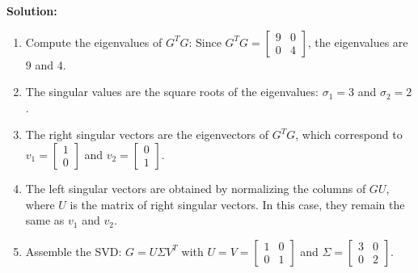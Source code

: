 \documentclass[8pt, a4paper, landscape]{extarticle}
\begin{document}
\begin{multicols*}{3}
  \textbf{Solution:}
  \begin{enumerate}
    \item Compute the eigenvalues of $G^TG$: Since $G^TG = \begin{bmatrix} 9 & 0 \\ 0 & 4 \end{bmatrix}$, the eigenvalues are $9$ and $4$.
    \item The singular values are the square roots of the eigenvalues: $\sigma_1 = 3$ and $\sigma_2 = 2$.
    \item The right singular vectors are the eigenvectors of $G^TG$, which correspond to $v_1 = \begin{bmatrix} 1 \\ 0 \end{bmatrix}$ and $v_2 = \begin{bmatrix} 0 \\ 1 \end{bmatrix}$.
    \item The left singular vectors are obtained by normalizing the columns of $GU$, where $U$ is the matrix of right singular vectors. In this case, they remain the same as $v_1$ and $v_2$.
    \item Assemble the SVD: $G = U\Sigma V^T$ with $U = V = \begin{bmatrix} 1 & 0 \\ 0 & 1 \end{bmatrix}$ and $\Sigma = \begin{bmatrix} 3 & 0 \\ 0 & 2 \end{bmatrix}$.
  \end{enumerate}




\end{multicols*}

\pagebreak
\end{document}
